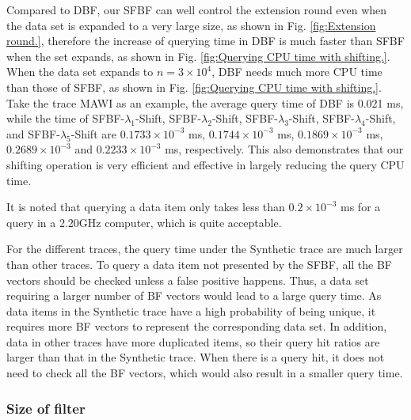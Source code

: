 \documentclass[10pt,journal,compsoc]{IEEEtran}
\begin{document}
 Compared to DBF, our SFBF can well control the extension round even when the data set is expanded to a very large size, as shown in Fig. \ref{fig:Extension round.}, therefore the increase of querying time in DBF is much faster than SFBF when the set expands, as shown in Fig. \ref{fig:Querying CPU time with shifting.}. When the data set expands to $n = 3 \times 10^4$, DBF needs much more CPU time than those of SFBF, as shown in Fig. \ref{fig:Querying CPU time with shifting.}. Take the trace MAWI as an example, the average query time of DBF is 0.021 ms, while the time of SFBF-$\lambda_1$-Shift, SFBF-$\lambda_2$-Shift, SFBF-$\lambda_3$-Shift, SFBF-$\lambda_4$-Shift, and SFBF-$\lambda_5$-Shift are $0.1733 \times 10^{-3}$ ms, $0.1744 \times 10^{-3}$ ms, $0.1869 \times 10^{-3}$ ms, $0.2689 \times 10^{-3}$ and $0.2233 \times 10^{-3}$ ms, respectively. This also   demonstrates that our shifting operation is  very
efficient and effective in largely reducing the query CPU time.

It is noted that querying a data item  only takes  less than $0.2 \times 10^{-3}$ ms for a query in a 2.20GHz computer, which is quite acceptable.

For the different traces, the query time under the Synthetic trace are much larger than other traces. To query a data item not presented by the SFBF, all the BF vectors should be checked unless a false positive happens.
Thus, a data set requiring a larger number of BF vectors would lead to a large query time. As data items in the Synthetic trace have a high probability of being  unique, it requires more BF vectors to represent the corresponding data set.  In addition,  data in other traces have more duplicated items, so their query hit ratios are larger than that in the Synthetic trace. When there is a query hit, it does not need to check all the BF vectors, which would also result in a smaller query time.



\subsubsection{Size of filter}
\end{document}
